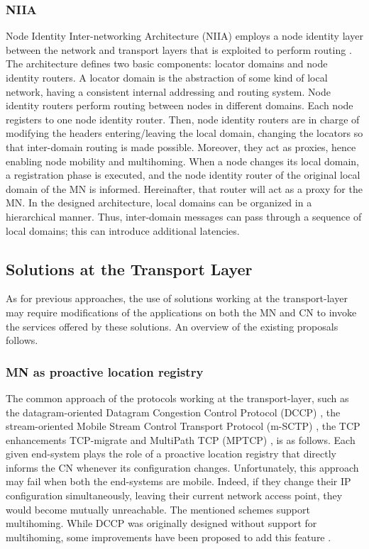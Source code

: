 \documentclass[preprint,12pt]{elsarticle}
\begin{document}
\subsubsection{NIIA}
Node Identity Inter-networking Architecture (NIIA) employs a 
node identity layer between the network and transport layers that is exploited 
to perform routing \cite{niia,Schutz:2010}.
The architecture defines two basic components: locator domains and node identity 
routers. A locator domain is the abstraction of some kind of local network, 
having a consistent internal addressing and routing system. 
Node identity routers perform routing between nodes in different domains. Each node registers to one node identity router. Then, node identity routers are in charge of modifying the headers entering/leaving the local domain, changing the locators so that inter-domain routing is made possible.
Moreover, they act as proxies, hence enabling node mobility and multihoming. When a node changes its 
local domain, a registration phase is executed, and the node identity 
router of the original local domain of the MN is informed. Hereinafter, that 
router will act as a proxy for the MN. 
In the designed architecture, local domains can be organized in a hierarchical manner. Thus, inter-domain messages can pass through a sequence of local domains; this can introduce additional latencies.


\subsection{Solutions at the Transport Layer}

As for previous approaches, the use of solutions working at the transport-layer may require 
modifications of the applications on both the MN and CN to invoke the services 
offered by these solutions. 
An overview of the existing proposals follows.

\subsubsection{MN as proactive location registry}
The common approach of the protocols working at the 
transport-layer, such as the datagram-oriented Datagram Congestion Control 
Protocol (DCCP) \cite{rfc4340}, the stream-oriented Mobile Stream Control 
Transport Protocol (m-SCTP) \cite{Budzisz:2012}, the TCP enhancements 
TCP-migrate \cite{snoeren2001reconsidering} and MultiPath TCP (MPTCP) 
\cite{mptcp,Paasch:2012}, is as follows. 
Each given end-system plays the 
role of a proactive location registry that directly informs the CN whenever its 
configuration changes. 
Unfortunately, this approach may fail when both the end-systems are mobile. Indeed, if they change their IP configuration simultaneously, leaving their current network access point, they would become mutually unreachable. 
The mentioned schemes support multihoming. While DCCP was originally designed without support for multihoming, some improvements have been proposed to add this feature \cite{DCCPMOB}.
\end{document}
